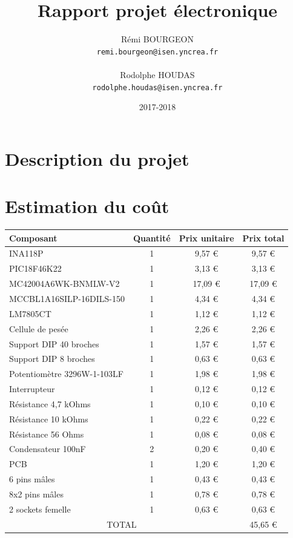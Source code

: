 \documentclass[a4paper,11pt,titlepage]{article}
\title{Rapport projet électronique}
\author{Rémi BOURGEON\\
\texttt{remi.bourgeon@isen.yncrea.fr}\\\\
Rodolphe HOUDAS\\
\texttt{rodolphe.houdas@isen.yncrea.fr}}
\date{2017-2018}
\begin{document}
\maketitle
\tableofcontents
\newpage


\section{Description du projet}

\section{Estimation du coût}

\begin{tabularx}{\textwidth}{l|c|c|c}
Composant&Quantité&Prix unitaire&Prix total\\
\hline
INA118P&1&9,57 \euro&9,57 \euro\\
PIC18F46K22&1&3,13 \euro&3,13 \euro\\
MC42004A6WK-BNMLW-V2&1&17,09 \euro&17,09 \euro\\
MCCBL1A16SILP-16DILS-150&1&4,34 \euro&4,34 \euro\\
LM7805CT&1&1,12 \euro&1,12 \euro\\
Cellule de pesée&1&2,26 \euro&2,26 \euro\\
Support DIP 40 broches&1&1,57 \euro&1,57 \euro\\
Support DIP 8 broches&1&0,63 \euro&0,63 \euro\\
Potentiomètre 3296W-1-103LF&1&1,98 \euro&1,98 \euro\\
Interrupteur&1&0,12 \euro&0,12 \euro\\
Résistance 4,7 kOhms&1&0,10 \euro&0,10 \euro\\
Résistance 10 kOhms&1&0,22 \euro&0,22 \euro\\
Résistance 56 Ohms&1&0,08 \euro&0,08 \euro\\
Condensateur 100nF&2&0,20 \euro&0,40 \euro\\
PCB&1&1,20 \euro&1,20 \euro\\
6 pins mâles&1&0,43 \euro&0,43 \euro\\
8x2 pins mâles&1&0,78 \euro&0,78 \euro\\
2 sockets femelle&1&0,63 \euro&0,63 \euro\\
\hline
\multicolumn{3}{c|}{TOTAL} & 45,65 \euro\\
\end{tabularx}
\end{document}
